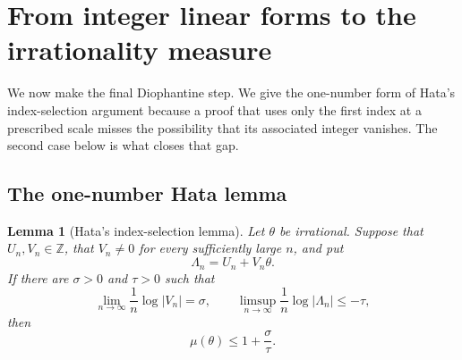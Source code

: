 \documentclass[11pt,reqno,letterpaper]{amsart}
\numberwithin{equation}{section}
\newtheorem{lemma}[theorem]{Lemma}
\theoremstyle{definition}
\theoremstyle{remark}
\begin{document}
\section{From integer linear forms to the irrationality measure}
\label{sec:measure}

We now make the final Diophantine step.  We give the one-number form of
Hata's index-selection argument \cite{hata-1993} because a proof that
uses only the first index at a prescribed scale misses the possibility
that its associated integer vanishes.  The second case below is what
closes that gap.

\subsection{The one-number Hata lemma}

\begin{lemma}[Hata's index-selection lemma]\label{lem:hata-one-number}
Let \(\theta\) be irrational.  Suppose that \(U_n,V_n\in\mathbb Z\),
that \(V_n\ne0\) for every sufficiently large \(n\), and put
\[
 \Lambda_n=U_n+V_n\theta.
\]
If there are \(\sigma>0\) and \(\tau>0\) such that
\begin{equation}\label{eq:hata-hypotheses}
 \lim_{n\to\infty}\frac1n\log|V_n|=\sigma,
 \qquad
 \limsup_{n\to\infty}\frac1n\log|\Lambda_n|\leq-\tau,
\end{equation}
then
\begin{equation}\label{eq:hata-conclusion}
 \mu(\theta)\leq1+\frac{\sigma}{\tau}.
\end{equation}
\end{lemma}
\end{document}
